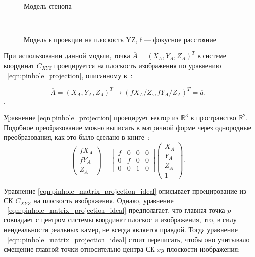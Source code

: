 \documentclass[12pt, a4paper]{article}
\begin{document}
\begin{figure}[h!]
  \centering
  
  \caption{Модель стенопа}
~\label{fig:pinhole_model}
\end{figure}

\begin{figure}[h!]
  \centering
  
  \caption{Модель в проекции на плоскость YZ, f --- фокусное расстояние}
~\label{fig:pinhole_geometry}
\end{figure}

При использовании данной модели, точка $\overline{A} = (X_A, Y_A, Z_A)^T$ в
системе координат $C_{XYZ}$ проецируется на плоскость изображения по уравнению
~\eqref{eqn:pinhole_projection}, описанному в~\cite{multiview_cv}:

\begin{equation}
    \overline{A} = (X_A, Y_A, Z_A)^T \rightarrow (fX_A/Z_a, fY_A/Z_A)^T = \overline{a}.
~\label{eqn:pinhole_projection}
\end{equation}.

Уравнение \eqref{eqn:pinhole_projection} проецирует вектор из $\mathbb{R}^3$ в
пространство $\mathbb{R}^2$. Подобное преобразование можно выписать в матричной
форме через однородные преобразования, как это было сделано в книге~\cite{multiview_cv}:
\begin{equation}
    \begin{pmatrix}
        f X_A \\
        f Y_A \\
        Z_A
    \end{pmatrix} = 
    \begin{bmatrix}
        f & 0 & 0 & 0 \\
        0 & f & 0 & 0 \\
        0 & 0 & 1 & 0
    \end{bmatrix} \begin{pmatrix}
        X_A\\
        Y_A\\
        Z_A\\
        1
    \end{pmatrix}.
~\label{eqn:pinhole_matrix_projection_ideal}
\end{equation}

Уравнение \eqref{eqn:pinhole_matrix_projection_ideal} описывает проецирование из
СК $C_{XYZ}$ на плоскость изображения.  Однако, уравнение
~\eqref{eqn:pinhole_matrix_projection_ideal} предполагает, что главная точка $p$
совпадает с центром системы координат плоскости изображения, что, в силу
неидеальности реальных камер, не всегда является правдой. Тогда уравнение
~\eqref{eqn:pinhole_matrix_projection_ideal} стоит переписать, чтобы оно
учитывало смещение главной точки относительно центра СК $xy$ плоскости
изображения:
    
\end{document}
